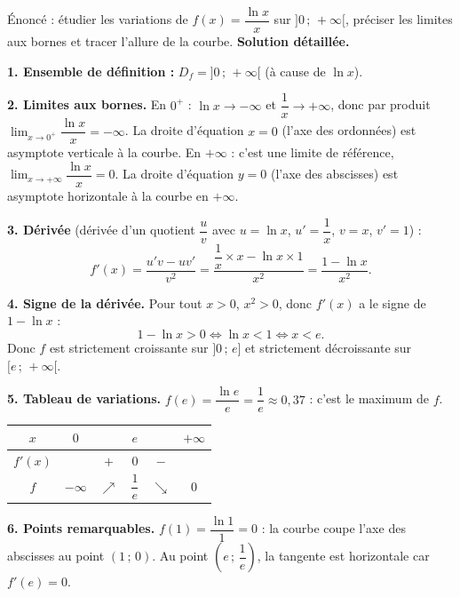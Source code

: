 \documentclass[11pt]{article}
\newcommand{\cle}[1]{{\popxbold\color{popdark}#1}}
\begin{document}
\begin{exoresolu}[Étude complète de $f(x)=\dfrac{\ln x}{x}$]
Énoncé : étudier les variations de $f(x)=\dfrac{\ln x}{x}$ sur $]0\,;\,+\infty[$, préciser les limites aux bornes et tracer l'allure de la courbe.
\tcblower
\textbf{Solution détaillée.}

\textbf{1. Ensemble de définition :} $D_f=]0\,;\,+\infty[$ (à cause de $\ln x$).

\textbf{2. Limites aux bornes.}
En $0^+$ : $\ln x\to-\infty$ et $\dfrac{1}{x}\to+\infty$, donc par produit $\lim_{x\to 0^+}\dfrac{\ln x}{x}=-\infty$. La droite d'équation $x=0$ (l'axe des ordonnées) est \cle{asymptote verticale} à la courbe.
En $+\infty$ : c'est une limite de référence, $\lim_{x\to+\infty}\dfrac{\ln x}{x}=0$. La droite d'équation $y=0$ (l'axe des abscisses) est \cle{asymptote horizontale} à la courbe en $+\infty$.

\textbf{3. Dérivée} (dérivée d'un quotient $\dfrac{u}{v}$ avec $u=\ln x$, $u'=\dfrac{1}{x}$, $v=x$, $v'=1$) :
\[ f'(x)=\frac{u'v-uv'}{v^2}=\frac{\dfrac{1}{x}\times x-\ln x\times 1}{x^2}=\frac{1-\ln x}{x^2}. \]

\textbf{4. Signe de la dérivée.} Pour tout $x>0$, $x^2>0$, donc $f'(x)$ a le signe de $1-\ln x$ :
\[ 1-\ln x>0 \iff \ln x<1 \iff x<e. \]
Donc $f$ est strictement croissante sur $]0\,;\,e]$ et strictement décroissante sur $[e\,;\,+\infty[$.

\textbf{5. Tableau de variations.} $f(e)=\dfrac{\ln e}{e}=\dfrac{1}{e}\approx 0,37$ : c'est le \cle{maximum} de $f$.
\begin{center}
\begin{tabular}{|c|ccccc|}\hline
$x$ & $0$ & & $e$ & & $+\infty$ \\ \hline
$f'(x)$ & & $+$ & $0$ & $-$ & \\ \hline
$f$ & $-\infty$ & $\nearrow$ & $\dfrac{1}{e}$ & $\searrow$ & $0$ \\ \hline
\end{tabular}
\end{center}

\textbf{6. Points remarquables.} $f(1)=\dfrac{\ln 1}{1}=0$ : la courbe coupe l'axe des abscisses au point $(1\,;\,0)$. Au point $\left(e\,;\,\dfrac{1}{e}\right)$, la tangente est \cle{horizontale} car $f'(e)=0$.
\end{exoresolu}
\end{document}
